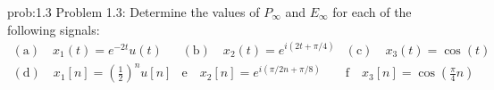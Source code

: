 \documentclass[koma,a4paper,utopia,12pt,listings-color,microtype,paralist,colorlinks,urlcolor=red]{org-article}
\begin{document}
\begin{prob}[]{prob:1.3}
Problem 1.3: Determine the values of \(P_{\infty}\) and \(E_{\infty}\) for each
of the following signals:
\begin{equation*}

\begin{array}{lll}
\mathrm{(a)} \quad x_{1}(t) = e^{-2t}u(t) & \mathrm{(b)} \quad x_{2}(t) = e^{i(2t + \pi/4)} & \mathrm{(c)} \quad x_{3}(t) = \cos(t) \\
\mathrm{(d)} \quad x_{1}[n] = (\tfrac{1}{2})^{n} u[n] & \mathrm{e} \quad x_{2}[n] = e^{i(\pi/2n + \pi/8)} & \mathrm{f} \quad x_{3}[n] = \cos(\tfrac{\pi}{4}n)
\end{array}
\end{equation*}
\label{prob:1.3}
\end{prob}
\end{document}
